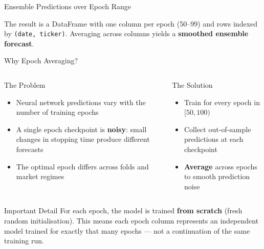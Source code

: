 \documentclass[aspectratio=169, 11pt]{beamer}
\begin{document}
%
%
\begin{frame}[fragile]{Ensemble Predictions over Epoch Range}

The result is a DataFrame with one column per epoch (50--99) and rows indexed by \texttt{(date, ticker)}. Averaging across columns yields a \textbf{smoothed ensemble forecast}.

\end{frame}
%
%
\begin{frame}{Why Epoch Averaging?}

\begin{columns}[T]
\begin{block}{The Problem}
\begin{itemize}
  \item Neural network predictions vary with the number of training epochs
  \item A single epoch checkpoint is \textbf{noisy}: small changes in stopping time produce different forecasts
  \item The optimal epoch differs across folds and market regimes
\end{itemize}
\end{block}

\begin{block}{The Solution}
\begin{itemize}
  \item Train for every epoch in $[50, 100)$
  \item Collect out-of-sample predictions at each checkpoint
  \item \textbf{Average} across epochs to smooth prediction noise
\end{itemize}
\end{block}
\end{columns}


\begin{alertblock}{Important Detail}
For each epoch, the model is trained \textbf{from scratch} (fresh random initialisation).
This means each epoch column represents an independent model trained for exactly that many epochs --- not a continuation of the same training run.
\end{alertblock}

\end{frame}
%
\end{document}
